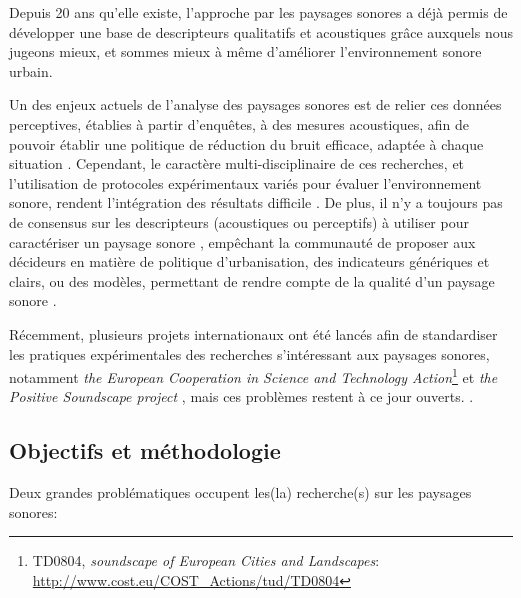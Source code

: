 Depuis 20 ans qu'elle existe, l'approche par les paysages sonores a déjà permis de développer une base de descripteurs qualitatifs et acoustiques grâce auxquels nous jugeons mieux, et sommes mieux à même d'améliorer l'environnement sonore urbain.  \citep{kang2006urban,schulte2007soundscape}

Un des enjeux actuels de l'analyse des paysages sonores est de relier ces données perceptives, établies à partir d'enquêtes, à des mesures acoustiques, afin de pouvoir établir une politique de réduction du bruit efficace, adaptée à chaque situation \citep{schulte2013soundscape}.
Cependant, le caractère multi-disciplinaire  de ces recherches, et l'utilisation de protocoles expérimentaux variés pour évaluer l'environnement sonore, rendent l’intégration des résultats difficile \citep{davies2013perception}. De plus, il n'y a toujours pas de consensus sur les descripteurs (acoustiques ou perceptifs) à utiliser pour caractériser un paysage sonore \citep{brocolini2012prediction,aletta2016soundscape}, empêchant la communauté de proposer aux décideurs en matière de politique d'urbanisation, des indicateurs génériques et clairs, ou des modèles, permettant de rendre compte de la qualité d'un paysage sonore .

Récemment, plusieurs projets internationaux ont été lancés afin de standardiser les pratiques expérimentales des recherches s’intéressant aux paysages sonores, notamment \emph{ the European Cooperation in Science and Technology Action}\footnote{TD0804, \emph{soundscape of European Cities and Landscapes}: \url{http://www.cost.eu/COST_Actions/tud/TD0804}} \citep{schulte2010soundscape} et \emph{the Positive Soundscape project} \citep{salford2106,davies2013perception}, mais ces problèmes restent à ce jour ouverts. \citep{schulte2013soundscape,ribeiro2013heart}.

\subsection{Objectifs et méthodologie}

Deux grandes problématiques occupent les(la) recherche(s) sur les paysages sonores:

